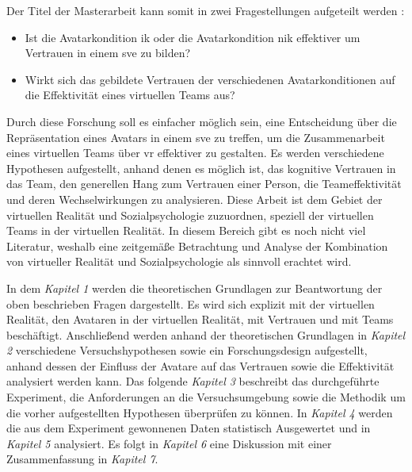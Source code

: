 \documentclass[a4paper,11pt]{article}%
\renewcommand{\\}{\vspace*{0.5\baselineskip} \newline}
\begin{document}
Der Titel der Masterarbeit kann somit in zwei Fragestellungen aufgeteilt werden :
\begin{itemize}
\item Ist die Avatarkondition \ac{ik} oder die Avatarkondition \ac{nik} effektiver um Vertrauen in einem \ac{sve} zu bilden?
\item Wirkt sich das gebildete Vertrauen der verschiedenen Avatarkonditionen auf die Effektivität eines virtuellen Teams aus?
\end{itemize}

	Durch diese Forschung soll es einfacher möglich sein, eine Entscheidung über die Repräsentation eines Avatars in einem \ac{sve} zu treffen, um die Zusammenarbeit eines virtuellen Teams über \ac{vr} effektiver zu gestalten.
Es werden verschiedene Hypothesen aufgestellt, anhand denen es möglich ist, das kognitive Vertrauen in das Team, den generellen Hang zum Vertrauen einer Person, die Teameffektivität und deren Wechselwirkungen zu analysieren.
Diese Arbeit ist dem Gebiet der virtuellen Realität und Sozialpsychologie zuzuordnen, speziell der virtuellen Teams in der virtuellen Realität.
In diesem Bereich gibt es noch nicht viel Literatur, weshalb eine zeitgemäße Betrachtung und Analyse der Kombination von virtueller Realität und Sozialpsychologie als sinnvoll erachtet wird.

In dem \textit{Kapitel 1} werden die theoretischen Grundlagen zur Beantwortung der oben beschrieben Fragen dargestellt. Es wird sich explizit mit der virtuellen Realität, den Avataren in der virtuellen Realität, mit Vertrauen und mit Teams beschäftigt.
Anschließend werden anhand der theoretischen Grundlagen in \textit{Kapitel 2} verschiedene Versuchshypothesen sowie ein Forschungsdesign aufgestellt, anhand dessen der Einfluss der Avatare auf das Vertrauen sowie die Effektivität analysiert werden kann.
Das folgende \textit{Kapitel 3} beschreibt das durchgeführte Experiment,  die Anforderungen an die Versuchsumgebung sowie die Methodik um die vorher aufgestellten Hypothesen überprüfen zu können. 
In \textit{Kapitel 4} werden die aus dem Experiment gewonnenen Daten statistisch Ausgewertet und in \textit{Kapitel 5} analysiert.
Es folgt in \textit{Kapitel 6} eine Diskussion mit einer Zusammenfassung in \textit{Kapitel 7}.
\end{document}
